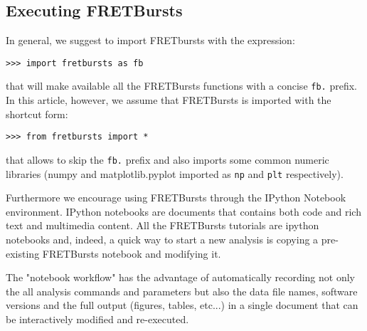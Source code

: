 \subsection{Executing FRETBursts}
In general, we suggest to import FRETbursts with the expression:

\begin{verbatim}
>>> import fretbursts as fb
\end{verbatim}

that will make available all the FRETBursts functions with a concise \verb|fb.|
prefix. In this article, however, we assume that FRETBursts is imported with the
shortcut form:

\begin{verbatim}
>>> from fretbursts import *
\end{verbatim}

that allows to skip the \verb|fb.| prefix and also imports some common numeric
libraries (numpy and matplotlib.pyplot imported as \verb|np| and \verb|plt|
respectively).

Furthermore we encourage using FRETBursts through the IPython Notebook
environment. IPython notebooks are documents that contains both code and
rich text and multimedia content. All the FRETBursts tutorials are 
ipython notebooks and, indeed, a quick way to start a new analysis is copying 
a pre-existing FRETBursts notebook and modifying it.

The "notebook workflow"\cite{Shen_2014} has the advantage of automatically
recording not only the all analysis commands and parameters but also the
data file names, software versions and the full output 
(figures, tables, etc...) in a single document that can be interactively 
modified and re-executed.


